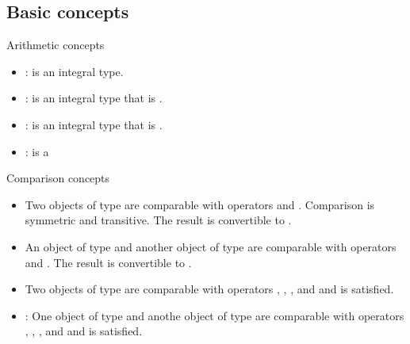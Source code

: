 \subsection{Basic concepts}

\begin{frame}[t,fragile]{Arithmetic concepts}
\begin{itemize}
  \item {}:  is an integral type.

  \item {}:  is an integral type that is .

  \item {}:  is an integral type that is .

  \item {}:  is a 
\end{itemize}
\end{frame}

\begin{frame}[t,fragile]{Comparison concepts}
\begin{itemize}
  \item {}
  Two objects of type  are comparable with operators \cppkey{==} and \cppkey{!=}.
  Comparison is symmetric and transitive.
  The result is convertible to .

  \item {}
  An object of type  and another object of type 
  are comparable with operators \cppkey{==} and \cppkey{!=}.
  The result is convertible to .

  \item {}
  Two objects of type  are comparable with operators 
  \cppkey{<}, \cppkey{<=}, \cppkey{>}, and \cppkey{>=} and  
   is satisfied.

  \item {}:
  One object of type  and anothe object of type 
  are comparable with operators 
  \cppkey{<}, \cppkey{<=}, \cppkey{>}, and \cppkey{>=} and  
   is satisfied.
\end{itemize}
\end{frame}


